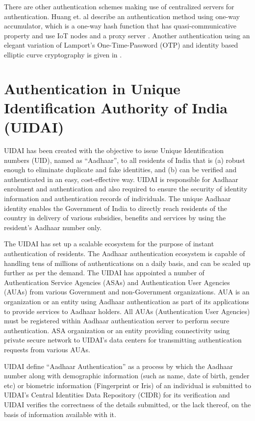 \begin{multicols}{2}
There are other authentication schemes making use of centralized servers for authentication. Huang et. al describe an authentication method using one-way accumulator, which is a one-way hash function that has quasi-communicative property and use IoT nodes and a proxy server \cite{chap2-key22}. Another authentication using an elegant variation of Lamport's One-Time-Password (OTP) and identity based elliptic curve cryptography is given in \cite{chap2-key22}.

\section*{Authentication in Unique Identification Authority of India (UIDAI)}

UIDAI has been created with the objective to issue Unique Identification numbers (UID), named as ``Aadhaar'', to all residents of India that is (a) robust enough to eliminate duplicate and fake identities, and (b) can be verified and authenticated in an easy, cost-effective way. UIDAI is responsible for Aadhaar enrolment and authentication and also required to ensure the security of identity information and authentication records of individuals. The unique Aadhaar identity enables the Government of India to directly reach residents of the country in delivery of various subsidies, benefits and services by using the resident's Aadhaar number only.
 
The UIDAI has set up a scalable ecosystem for the purpose of instant authentication of residents. The Aadhaar authentication ecosystem is capable of handling tens of millions of authentications on a daily basis, and can be scaled up further as per the demand. The UIDAI has appointed a number of Authentication Service Agencies (ASAs) and Authentication User Agencies (AUAs) from various Government and non-Government organizations. AUA is an organization or an entity using Aadhaar authentication as part of its applications to provide services to Aadhaar holders. All AUAs (Authentication User Agencies) must be registered within Aadhaar authentication server to perform secure authentication. ASA organization or an entity providing connectivity using private secure network to UIDAI's data centers for transmitting authentication requests from various AUAs.
 
UIDAI define ``Aadhaar Authentication'' as a process by which the Aadhaar number along with demographic information (such as name, date of birth, gender etc) or biometric information (Fingerprint or Iris) of an individual is submitted to UIDAI's Central Identities Data Repository (CIDR) for its verification and UIDAI verifies the correctness of the details submitted, or the lack thereof, on the basis of information available with it.
 

\end{multicols}
